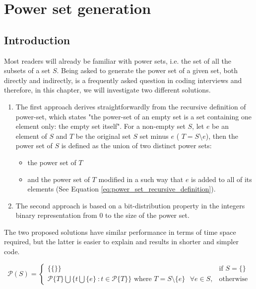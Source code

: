 %


\chapter{Power set generation}
\label{ch:power_set}
\section*{Introduction}

Most readers will already be familiar with power sets, i.e.  the set of all the subsets of a set $S$.  Being asked to generate the power set of a given set, both directly and indirectly, is a frequently asked question in coding interviews and therefore, in this chapter, we will investigate  two different solutions.  

\begin{enumerate}
    \item The first approach derives straightforwardly from the recursive definition of power-set, which states "the power-set of an empty set is a set containing one element only: the empty set itself". 
    For a non-empty set $S$, let $e$ be an element of $S$ and $T$ be the original set $S$ set minus $e$ ( $T=S \setminus e$), then the power set of $S$ is defined as the union of two distinct power sets:
    \begin{itemize}
        \item   the power set of $T$
        \item   and the power set of $T$ modified in a such way that $e$ is added to all of its elements (See Equation \ref{eq:power_set_recursive_definition}).  
    \end{itemize}
    \item The second approach is based on a bit-distribution property in the integers binary representation from $0$ to the size of the power set.

\end{enumerate}

The two proposed solutions have similar performance in terms of time space required, but the latter is easier to explain and results in shorter and simpler code. 

\begin{equation}
    \mathcal{P}(S)=\begin{cases} 
    \{\{\}\} & \text{if } S=\{\} \\
    \mathcal{P}\{T\} \bigcup \{t \bigcup \{e\} \: : t \in \mathcal{P}\{T\}\} \text{ where }  T = S \setminus \{e\} \text{ } \forall e \in S, & \text{otherwise}
    \end{cases}
    \label{eq:power_set_recursive_definition}
\end{equation}



